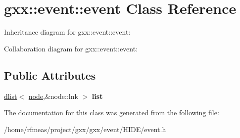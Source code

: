 \hypertarget{classgxx_1_1event_1_1event}{}\section{gxx\+:\+:event\+:\+:event Class Reference}
\label{classgxx_1_1event_1_1event}


Inheritance diagram for gxx\+:\+:event\+:\+:event\+:


Collaboration diagram for gxx\+:\+:event\+:\+:event\+:
\subsection*{Public Attributes}
\begin{DoxyCompactItemize}
\item 
\hyperlink{classgxx_1_1dlist}{dlist}$<$ \hyperlink{classgxx_1_1event_1_1node}{node},\&node\+::lnk $>$ {\bfseries list}\hypertarget{classgxx_1_1event_1_1event_a3fc2ad4af4ed9db855872dd6ca806743}{}\label{classgxx_1_1event_1_1event_a3fc2ad4af4ed9db855872dd6ca806743}

\end{DoxyCompactItemize}


The documentation for this class was generated from the following file\+:\begin{DoxyCompactItemize}
\item 
/home/rfmeas/project/gxx/gxx/event/\+H\+I\+D\+E/event.\+h\end{DoxyCompactItemize}
